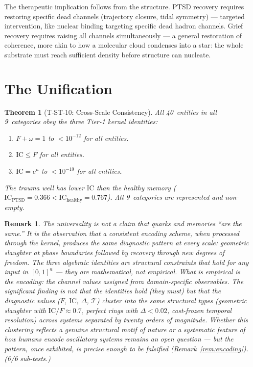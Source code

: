 \documentclass[
  aps,
  prd,
  twocolumn,
  superscriptaddress,
  nofootinbib,
  floatfix
]{revtex4-2}
\newtheorem{theorem}{Theorem}
\newtheorem{remark}{Remark}
\newcommand{\IC}{\mathrm{IC}}
\begin{document}
The therapeutic implication follows from the structure.
PTSD recovery requires restoring specific dead channels
(trajectory closure, tidal symmetry) --- targeted
intervention, like nuclear binding targeting specific
dead hadron channels.  Grief recovery requires raising all
channels simultaneously --- a general restoration of
coherence, more akin to how a molecular cloud condenses
into a star: the whole substrate must reach sufficient
density before structure can nucleate.


\section{The Unification}\label{sec:unification}

\begin{theorem}[T-ST-10: Cross-Scale Consistency]
\label{thm:T10}
All 40~entities in all 9~categories obey the three Tier-1
kernel identities:
\begin{enumerate}
\item $F + \omega = 1$ to $< 10^{-12}$ for all entities.
\item $\IC \leq F$ for all entities.
\item $\IC = e^{\kappa}$ to $< 10^{-10}$ for all entities.
\end{enumerate}
The trauma well has lower $\IC$ than the healthy memory
($\IC_{\text{PTSD}} = 0.366 < \IC_{\text{healthy}} = 0.767$).
All 9~categories are represented and non-empty.
\end{theorem}

\begin{remark}
The universality is not a claim that quarks and memories
``are the same.''  It is the observation that a consistent
encoding scheme, when processed through the kernel, produces
the same diagnostic pattern at every scale: geometric
slaughter at phase boundaries followed by recovery through
new degrees of freedom.  The three algebraic identities are
structural constraints that hold for \emph{any} input in
$[0,1]^n$ --- they are mathematical, not empirical.  What is
empirical is the encoding: the channel values assigned from
domain-specific observables.  The significant finding is not
that the identities hold (they must) but that the
\emph{diagnostic values} ($F$, $\IC$, $\Delta$, $\mathcal{T}$)
cluster into the same structural types (geometric slaughter
with $\IC/F \approx 0.7$, perfect rings with $\Delta < 0.02$,
cost-frozen temporal resolution) across systems separated by
twenty orders of magnitude.  Whether this clustering reflects
a genuine structural motif of nature or a systematic feature
of how humans encode oscillatory systems remains an open
question --- but the pattern, once exhibited, is precise
enough to be falsified (Remark~\ref{rem:encoding}).
(6/6 sub-tests.)
\end{remark}
\end{document}
